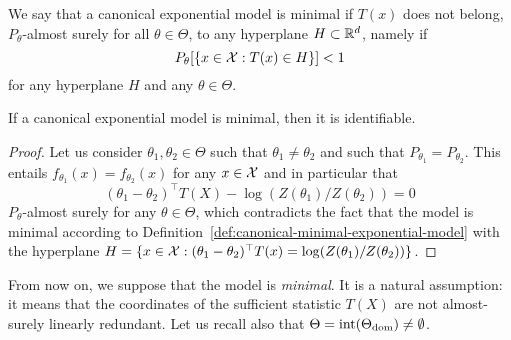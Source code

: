 \begin{definition}
	\label{def:canonical-minimal-exponential-model}
	We say that a canonical exponential model is minimal if $T(x)$ does not belong, $P_\theta$-almost surely for all $\theta \in \Theta$, to any hyperplane $H \subset \mathbb R^d$, namely if 
	\begin{equation*}
		P_\theta[ \{ x \in \operatorname{{\mathcal X}} : T(x) \in H \}] < 1
	\end{equation*}
	for any hyperplane $H$ and any $\theta \in \Theta$.
\end{definition}

\begin{proposition}
	If a canonical exponential model is minimal, then it is identifiable.
\end{proposition}

\begin{proof}
Let us consider $\theta_1, \theta_2 \in \Theta$ such that $\theta_1 \neq \theta_2$ and such that $P_{\theta_1} = P_{\theta_2}$.
This entails $f_{\theta_1}(x) = f_{\theta_2}(x)$ for any $x \in \operatorname{{\mathcal X}}$ and in particular that
\begin{equation*}
	(\theta_1 - \theta_2)^\top T(X) - \log (Z(\theta_1) / Z(\theta_2)) = 0
\end{equation*}
$P_\theta$-almost surely for any $\theta \in \Theta$, which contradicts the fact that the model is minimal according to Definition~\ref{def:canonical-minimal-exponential-model} with the hyperplane $H = \{ x \in \operatorname{{\mathcal X}} : (\theta_1 - \theta_2)^\top T(x) = \log (Z(\theta_1) / Z(\theta_2)) \}$. \qedhere
\end{proof}

From now on, we suppose that the model is \emph{minimal}.
It is a natural assumption: it means that the coordinates of the sufficient statistic $T(X)$ are not almost-surely linearly redundant.
Let us recall also that $\Theta = \operatorname{int}(\Theta_{\operatorname{dom}}) \neq \emptyset$.

